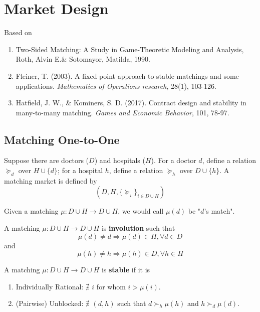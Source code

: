 \documentclass[11pt]{elegantbook}
\begin{document}
\chapter{Market Design}
Based on
\begin{enumerate}[$\circ$]
    \item Two-Sided Matching: A Study in Game-Theoretic Modeling and Analysis, Roth, Alvin E.\& Sotomayor, Matilda, 1990.
    \item Fleiner, T. (2003). A fixed-point approach to stable matchings and some applications. \textit{Mathematics of Operations research}, 28(1), 103-126.
    \item Hatfield, J. W., \& Kominers, S. D. (2017). Contract design and stability in many-to-many matching. \textit{Games and Economic Behavior}, 101, 78-97.
\end{enumerate}
\section{Matching One-to-One}
Suppose there are doctors ($D$) and hospitals ($H$). For a doctor $d$, define a relation $\succeq_d$ over $H\cup\{d\}$; for a hospital $h$, define a relation $\succeq_h$ over $D\cup\{h\}$. A matching market is defined by $$\left(D,H,\{\succeq_i\}_{i\in D\cup H}\right)$$

\begin{note}
    Given a matching $\mu: D\cup H \rightarrow D\cup H$, we would call $\mu(d)$ be "$d$'s match".
\end{note}

\begin{definition}[Involution]
    \normalfont
    A matching $\mu: D\cup H \rightarrow D\cup H$ is \textbf{involution} such that $$\mu (d)\neq d \Rightarrow \mu(d)\in H, \forall d\in D$$ and $$\mu (h)\neq h \Rightarrow \mu(h)\in D, \forall h\in H$$
\end{definition}

\begin{definition}[Stable]
    \normalfont
    A matching $\mu: D\cup H \rightarrow D\cup H$ is \textbf{stable} if it is
    \begin{enumerate}[$\circ$]
        \item Individually Rational: $\nexists$ $i$ for whom $i>\mu(i)$.
        \item (Pairwise) Unblocked: $\nexists$ $(d,h)$ such that $d\succ_h \mu(h)$ and $h\succ_d \mu(d)$.
    \end{enumerate}
\end{definition}
\end{document}
